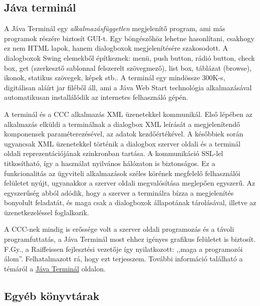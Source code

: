  
\subsection{Jáva terminál}
 
A Jáva Terminál egy {\em alkalmazásfüggetlen} megjelenítő program,
ami más programok részére biztosít GUI-t.
Egy böngészőhöz lehetne hasonlítani, csakhogy ez nem HTML lapok,
hanem dialogboxok megjelenítésére szakosodott.
A dialogboxok Swing elemekből építkeznek:
menü, 
push button, 
rádió button, 
check box, 
get (szerkesztő sablonnal felszerelt szövegmező),
list box, 
táblázat (browse), 
ikonok, statikus szövegek, képek stb..
A terminál egy mindössze 300K-s, digitálisan aláírt jar filéből áll,
ami a Jáva Web Start technológia alkalmazásával  automatikusan 
installálódik az internetes felhasználó gépén.
 
A terminál és a CCC alkalmazás XML üzenetekkel kommunikál.
Első lépében az alkalmazás elküldi a terminálnak
a dialogbox XML leírását a  megjelenítendő komponensek paraméterezésével, 
az adatok  kezdőértékével. A későbbiek során ugyancsak XML üzenetekkel 
történik a dialogbox szerver oldali és a terminál oldali reprezentációjának
szinkronban tartása. A kommunikáció SSL-lel titkosítható, 
így a használat nyilvános hálózaton is biztonságos.
Ez a funkcionalitás az ügyviteli alkalmazások széles 
körének megfelelő felhasználói felületet nyújt, ugyanakkor
a szerver oldali megvalósítása meglepően egyszerű.
Az egyszerűség abból adódik, hogy a szerver a terminálra
bízza a megjelenítés bonyolult feladatát, és maga
csak a dialogboxok állapotának tárolásával, illetve az
üzenetkezeléssel foglalkozik.

A CCC-nek mindig is erőssége volt a szerver oldali programozás
és a távoli programfuttatás, a Jáva Terminál most ehhez igényes 
grafikus felületet is biztosít.
F.Gy., a Raiffeissen fejlesztési vezetője így nyilatkozott: 
,,maga a programozói álom''. Felhatalmazott rá, hogy ezt terjesszem.
További információ található a témáról a 
\href{jterminal.html}{Jáva Terminál} oldalon.

\subsection{Egyéb könyvtárak}

